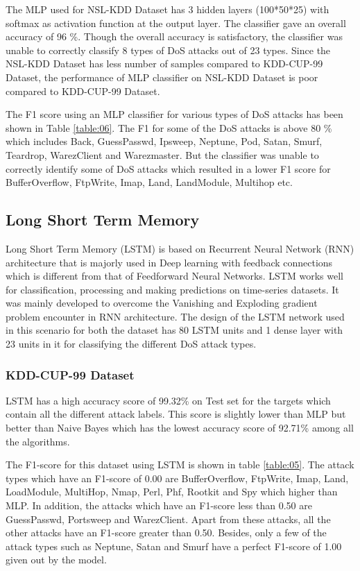\documentclass[conference]{IEEEtran}
\begin{document}
The MLP used for NSL-KDD Dataset has 3 hidden layers (100*50*25) with softmax as activation function at the output layer. The classifier gave an overall accuracy of 96 \%.  Though the overall accuracy is satisfactory, the classifier was unable to correctly classify 8 types of DoS attacks out of 23 types. Since the NSL-KDD Dataset has less number of samples compared to KDD-CUP-99 Dataset, the performance of MLP classifier on NSL-KDD Dataset is poor compared to KDD-CUP-99 Dataset.

The F1 score using an MLP classifier for various types of DoS attacks has been shown in Table \ref{table:06}. The F1 for some of the DoS attacks is above 80 \% which includes Back, GuessPasswd, Ipsweep, Neptune, Pod, Satan, Smurf, Teardrop, WarezClient and Warezmaster. But the classifier was unable to correctly identify some of DoS attacks which resulted in a lower F1 score for BufferOverflow, FtpWrite, Imap, Land, LandModule, Multihop etc.

\subsection{Long Short Term Memory}
Long Short Term Memory (LSTM) \cite{lstm} is based on Recurrent Neural Network (RNN) architecture that is majorly used in Deep learning with feedback connections which is different from that of Feedforward Neural Networks. LSTM works well for classification, processing and making predictions on time-series datasets. It was mainly developed to overcome the Vanishing and Exploding gradient problem encounter in RNN architecture. The design of the LSTM network used in this scenario for both the dataset has 80 LSTM units and 1 dense layer with 23 units in it for classifying the different DoS attack types. 


\subsubsection{KDD-CUP-99 Dataset}

LSTM has a high accuracy score of 99.32\% on Test set for the targets which contain all the different attack labels. This score is slightly lower than MLP but better than Naive Bayes which has the lowest accuracy score of 92.71\% among all the algorithms.

The F1-score for this dataset using LSTM is shown in table \ref{table:05}. The attack types which have an F1-score of 0.00 are BufferOverflow, FtpWrite, Imap, Land, LoadModule, MultiHop, Nmap, Perl, Phf, Rootkit and Spy which higher than MLP. In addition, the attacks which have an F1-score less than 0.50 are GuessPasswd, Portsweep and WarezClient. Apart from these attacks, all the other attacks have an F1-score greater than 0.50. Besides, only a few of the attack types such as Neptune, Satan and Smurf have a perfect F1-score of 1.00 given out by the model.  
\end{document}

